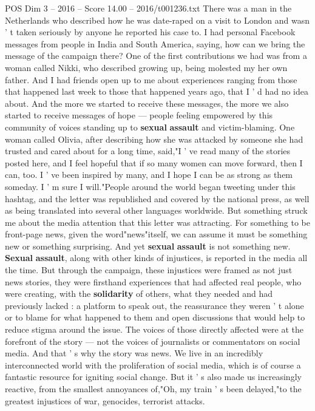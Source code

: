 \begin{textsample}{POS Dim 3 – 2016 – Score 14.00 – 2016/t001236.txt}
There was a man in the Netherlands who described how he was date-raped on a visit to London and wasn ' t taken seriously by anyone he reported his case to.
I had personal Facebook messages from people in India and South America, saying, how can we bring the message of the campaign there?
One of the first contributions we had was from a woman called Nikki, who described growing up, being molested my her own father.
And I had friends open up to me about experiences ranging from those that happened last week to those that happened years ago, that I ' d had no idea about.
And the more we started to receive these messages, the more we also started to receive messages of hope — people feeling empowered by this community of voices standing up to \textbf{sexual} \textbf{assault} and victim-blaming.
One woman called Olivia, after describing how she was attacked by someone she had trusted and cared about for a long time, said,"I ' ve read many of the stories posted here, and I feel hopeful that if so many women can move forward, then I can, too.
I ' ve been inspired by many, and I hope I can be as strong as them someday.
I ' m sure I will."People around the world began tweeting under this hashtag, and the letter was republished and covered by the national press, as well as being translated into several other languages worldwide.
But something struck me about the media attention that this letter was attracting.
For something to be front-page news, given the word"news"itself, we can assume it must be something new or something surprising.
And yet \textbf{sexual} \textbf{assault} is not something new. \textbf{Sexual} \textbf{assault}, along with other kinds of injustices, is reported in the media all the time.
But through the campaign, these injustices were framed as not just news stories, they were firsthand experiences that had affected real people, who were creating, with the \textbf{solidarity} of others, what they needed and had previously lacked : a platform to speak out, the reassurance they weren ' t alone or to blame for what happened to them and open discussions that would help to reduce stigma around the issue.
The voices of those directly affected were at the forefront of the story — not the voices of journalists or commentators on social media.
And that ' s why the story was news.
We live in an incredibly interconnected world with the proliferation of social media, which is of course a fantastic resource for igniting social change.
But it ' s also made us increasingly reactive, from the smallest annoyances of,"Oh, my train ' s been delayed,"to the greatest injustices of war, genocides, terrorist attacks.

\end{textsample}
